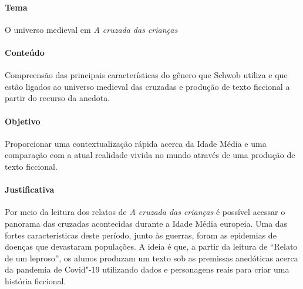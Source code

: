 \documentclass[12pt]{extarticle}
\begin{document}
 \paragraph{Tema} O universo medieval em \textit{A cruzada das crianças}

 \paragraph{Conteúdo} Compreensão das principais características do gênero
 que Schwob utiliza e que estão ligados ao universo medieval
 das cruzadas e produção de texto ficcional a partir do recurso da anedota.

 \paragraph{Objetivo} Proporcionar uma contextualização rápida acerca da Idade Média e
 uma comparação com a atual realidade vivida no mundo através de uma produção 
 de texto ficcional.


 \paragraph{Justificativa} Por meio da leitura dos relatos de \textit{A cruzada das crianças}
 é possível acessar o panorama das cruzadas acontecidas durante a Idade Média europeia.
 Uma das fortes características deste período, junto às guerras, foram as epidemias de 
 doenças que devastaram populações. A ideia é que, a partir da leitura de ``Relato 
 de um leproso'', os alunos produzam um texto sob as premissas anedóticas acerca
 da pandemia de Covid"-19 utilizando dados e personagens reais para criar uma 
 história ficcional.
\end{document}
